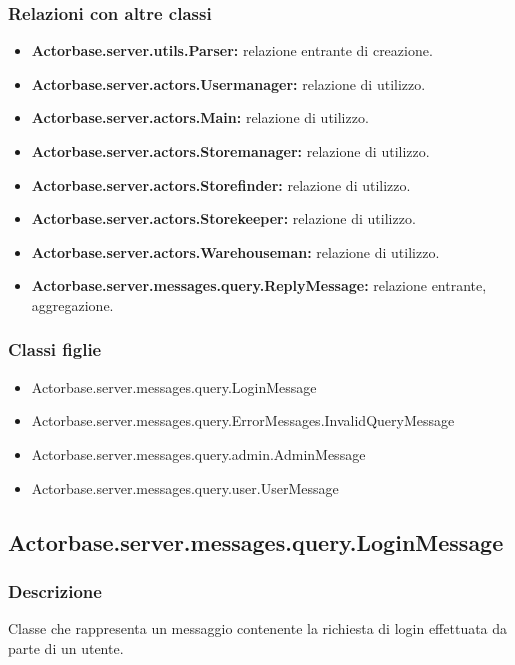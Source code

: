 \documentclass[a4paper]{article}
\begin{document}
			\subsubsection{Relazioni con altre classi}
				\begin{itemize}
					\item \textbf{Actorbase.server.utils.Parser:} relazione entrante di creazione.
					\item \textbf{Actorbase.server.actors.Usermanager:} relazione di utilizzo.
					\item \textbf{Actorbase.server.actors.Main:} relazione di utilizzo.
					\item \textbf{Actorbase.server.actors.Storemanager:} relazione di utilizzo.
					\item \textbf{Actorbase.server.actors.Storefinder:} relazione di utilizzo.
					\item \textbf{Actorbase.server.actors.Storekeeper:} relazione di utilizzo.
					\item \textbf{Actorbase.server.actors.Warehouseman:} relazione di utilizzo.
					\item \textbf{Actorbase.server.messages.query.ReplyMessage:} relazione entrante, aggregazione.
				\end{itemize}
			\subsubsection{Classi figlie}
				\begin{itemize}
					\item Actorbase.server.messages.query.LoginMessage
					\item Actorbase.server.messages.query.ErrorMessages.InvalidQueryMessage
					\item Actorbase.server.messages.query.admin.AdminMessage
					\item Actorbase.server.messages.query.user.UserMessage
				\end{itemize}
				
		\subsection{Actorbase.server.messages.query.LoginMessage}
			\subsubsection{Descrizione}
				Classe che rappresenta un messaggio contenente la richiesta di login effettuata da parte di un utente.
				
\end{document}
